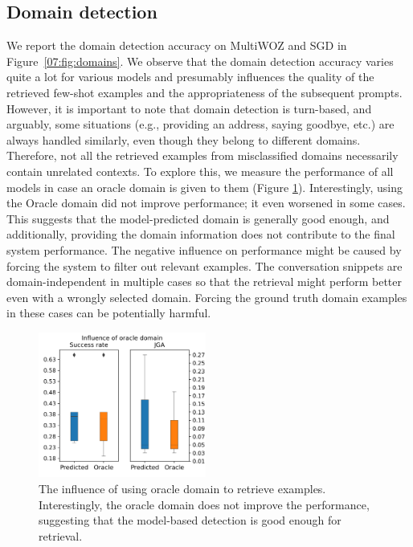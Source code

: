 \subsection{Domain detection}
\label{subsec:domain}
We report the domain detection accuracy on MultiWOZ and SGD
in Figure~\ref{07:fig:domains}.
We observe that the domain detection accuracy varies quite a lot for various models and presumably influences the quality of the retrieved few-shot examples and the appropriateness of the subsequent prompts.
However, it is important to note that domain detection is turn-based, and arguably, some situations (e.g., providing an address, saying goodbye, etc.) are always handled similarly, even though they belong to different domains.
Therefore, not all the retrieved examples from misclassified domains necessarily contain unrelated contexts.
To explore this, we measure the performance of all models in case an oracle domain is given to them (Figure \ref{fig:oracle_domains}).
Interestingly, using the Oracle domain did not improve performance; it even worsened in some cases.
This suggests that the model-predicted domain is generally good enough, and additionally, providing the domain information does not contribute to the final system performance.
The negative influence on performance might be caused by forcing the system to filter out relevant examples.
The conversation snippets are domain-independent in multiple cases so that the retrieval might perform better even with a wrongly selected domain.
Forcing the ground truth domain examples in these cases can be potentially harmful.

\begin{figure}[h]
    \centering
    \includegraphics[width=0.49\textwidth]{images/oracle_domains.png}
    \caption{The influence of using oracle domain to retrieve examples. Interestingly, the oracle domain does not improve the performance, suggesting that the model-based detection is good enough for retrieval.}
    \label{fig:oracle_domains}
\end{figure}

